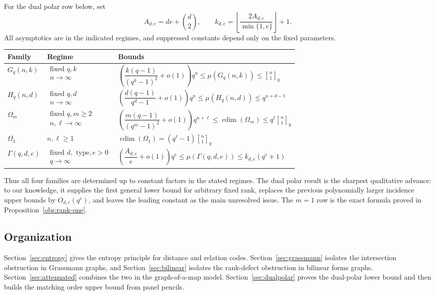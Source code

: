 \documentclass[11pt]{article}
\theoremstyle{definition}
\theoremstyle{remark}
\newcommand{\cdim}{\operatorname{cdim}}
\newcommand{\qbinom}[2]{\genfrac{[}{]}{0pt}{}{#1}{#2}_q}
\begin{document}
For the dual polar row below, set
\[
        A_{d,e}=de+\binom d2,\qquad
        k_{d,e}=\left\lfloor\frac{2A_{d,e}}{\min\{1,e\}}\right\rfloor+1.
\]
All asymptotics are in the indicated regimes, and suppressed constants
depend only on the fixed parameters.
\begin{center}
\small
\begin{tabular}{lll}
\toprule
Family & Regime & Bounds \\
\midrule
$G_q(n,k)$ &
$\substack{\text{fixed }q,k\\ n\to\infty}$ &
$\left(\dfrac{k(q-1)}{(q^k-1)^2}+o(1)\right)q^n
 \leq \mu(G_q(n,k))\leq \qbinom n1$ \cite{BaileyMeagher} \\
\addlinespace
$H_q(n,d)$ &
$\substack{\text{fixed }q,d\\ n\to\infty}$ &
$\left(\dfrac{d(q-1)}{q^d-1}+o(1)\right)q^n
 \leq \mu(H_q(n,d))\leq q^{n+d-1}$ \cite{FengWang,GuoLiWangFour} \\
\addlinespace
$\Omega_m$ &
$\substack{\text{fixed }q,m\geq2\\ n,\ell\to\infty}$ &
$\left(\dfrac{m(q-1)}{(q^m-1)^2}+o(1)\right)q^{n+\ell}
 \leq \cdim(\Omega_m)\leq q^\ell\qbinom n1$ \cite{GuoLiWang} \\
\addlinespace
$\Omega_1$ &
$n,\ell\geq1$ &
$\cdim(\Omega_1)=(q^\ell-1)\qbinom n1$ \\
\addlinespace
$\Gamma(q,d,e)$ &
$\substack{\text{fixed }d,\text{ type},e>0\\ q\to\infty}$ &
$\left(\dfrac{A_{d,e}}{e}+o(1)\right)q^e
 \leq \mu(\Gamma(q,d,e))\leq k_{d,e}(q^e+1)$ \\
\bottomrule
\end{tabular}
\end{center}

Thus all four families are determined up to constant factors in the stated
regimes.  The dual polar result is the sharpest qualitative advance: to our
knowledge, it supplies the first general lower bound for arbitrary fixed rank,
replaces the previous
polynomially larger incidence upper bounds by $O_{d,e}(q^e)$, and leaves 
the
leading constant as the main unresolved issue.  The $m=1$ row is the exact
formula proved in Proposition~\ref{obs:rank-one}.

\subsection*{Organization}

Section~\ref{sec:entropy} gives the entropy principle for distance and
relation codes.  Section~\ref{sec:grassmann} isolates the intersection
obstruction in Grassmann graphs, and Section~\ref{sec:bilinear} isolates the
rank-defect obstruction in bilinear forms graphs.  Section~\ref{sec:attenuated}
combines the two in the graph-of-a-map model.  Section~\ref{sec:dualpolar}
proves the dual-polar lower bound and then builds the matching order upper
bound from panel pencils.
\end{document}
